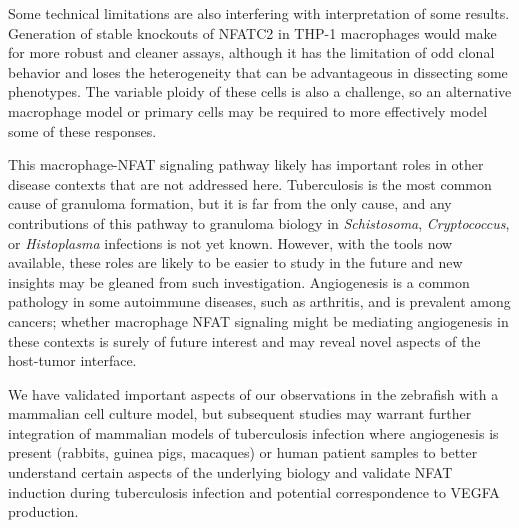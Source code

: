 Some technical limitations are also interfering with interpretation of some results. Generation of stable knockouts of NFATC2 in THP\hyp{}1 macrophages would make for more robust and cleaner assays, although it has the limitation of odd clonal behavior and loses the heterogeneity that can be advantageous in dissecting some phenotypes. The variable ploidy of these cells is also a challenge, so an alternative macrophage model or primary cells may be required to more effectively model some of these responses.

This macrophage\hyp{}NFAT signaling pathway likely has important roles in other disease contexts that are not addressed here. Tuberculosis is the most common cause of granuloma formation, but it is far from the only cause, and any contributions of this pathway to granuloma biology in \textit{Schistosoma}, \textit{Cryptococcus}, or \textit{Histoplasma} infections is not yet known. However, with the tools now available, these roles are likely to be easier to study in the future and new insights may be gleaned from such investigation. Angiogenesis is a common pathology in some autoimmune diseases, such as arthritis, and is prevalent among cancers; whether macrophage NFAT signaling might be mediating angiogenesis in these contexts is surely of future interest and may reveal novel aspects of the host\hyp{}tumor interface.

We have validated important aspects of our observations in the zebrafish with a mammalian cell culture model, but subsequent studies may warrant further integration of mammalian models of tuberculosis infection where angiogenesis is present (rabbits, guinea pigs, macaques) or human patient samples to better understand certain aspects of the underlying biology and validate NFAT induction during tuberculosis infection and potential correspondence to VEGFA production.

